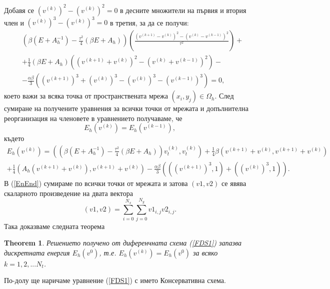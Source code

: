 \documentclass{article}
\newcommand{\be}{\begin{equation}}
\newcommand{\ee}{\end{equation}}
\newcommand{\rf}[1]{(\ref{#1})}
\newtheorem{thm}{Theorem}
\begin{document}
Добавя се $(v^{(k)})^2 - (v^{(k)})^2 = 0$ в десните множители на първия и втория член и $(v^{(k)})^3 - (v^{(k)})^3 = 0$ в третия, за да се получи:
 \begin{align}\label{EnEnd}
&\left( \beta (E+A_h^{-1})- \frac{\tau^2}{4}(\beta E+A_h ) \right) \left( \frac{(v^{(k+1)} - v^{(k)} )^2 - (v^{(k)} - v^{(k-1)})^2}{\tau^2}   \right )  + \\
& +\frac{1}{4} (\beta E +A_h ) \left( (v^{(k+1)}+v^{(k)})^2 -  (v^{(k)}+v^{(k-1)})^2  \right ) - \\
&- \frac{\alpha \beta}{3}\left( (v^{(k+1)})^3 + (v^{(k)})^3 - (v^{(k)})^3 - (v^{(k-1)})^3 \right) =0,
\end{align}
което важи за всяка точка от пространствената мрежа $(x_i,y_j) \in \Omega_h$. След сумиране на получените уравнения за всички точки от мрежата и допълнителна реорганизация на членовете в уравнението получаваме, че
\be \label{num_en}
E_h(v^{(k)}) =E_h(v^{(k-1)}),
\ee
където
\begin{align*}
E_h(v^{(k)})=\left( \left( \beta (E+A_h^{-1})- \frac{\tau^2}{4}(\beta E+A_h ) \right)v_{t}^{(k)} ,v_{t}^{(k)} \right)+\frac{1}{4} \beta \left(  v^{(k+1)}+v^{(k)}, v^{(k+1)}+v^{(k)} \right) \\
+\frac{1}{4}  \left(  A_h(v^{(k+1)}+v^{(k)}), v^{(k+1)}+v^{(k)} \right)
- \frac{\alpha \beta}{3} \left( ((v^{(k+1)})^3,1)+((v^{(k)})^3,1) \right).
\end{align*}
В \rf{EnEnd} сумираме по всички точки от мрежата и затова  $( v1, v2 )$ се явява скаларното произведение на двата вектора 
$$( v1, v2) = \sum_{i=0}^{N_x} \sum_{j=0}^{N_y} v1_{i,j} v2_{i,j}.$$
Така доказваме следната теорема
\begin{thm}
Решението получено от диференчната схема \rf{FDS1} запазва дискретната енергия $E_h(v^0)$, т.е.  $E_h(v^{(k)}) =E_h(v^{0})$ за всяко $k=1,2,...N_t$.
\end{thm}
По-долу ще наричаме уравнение \rf{FDS1} с името Консервативна схема.
\end{document}
